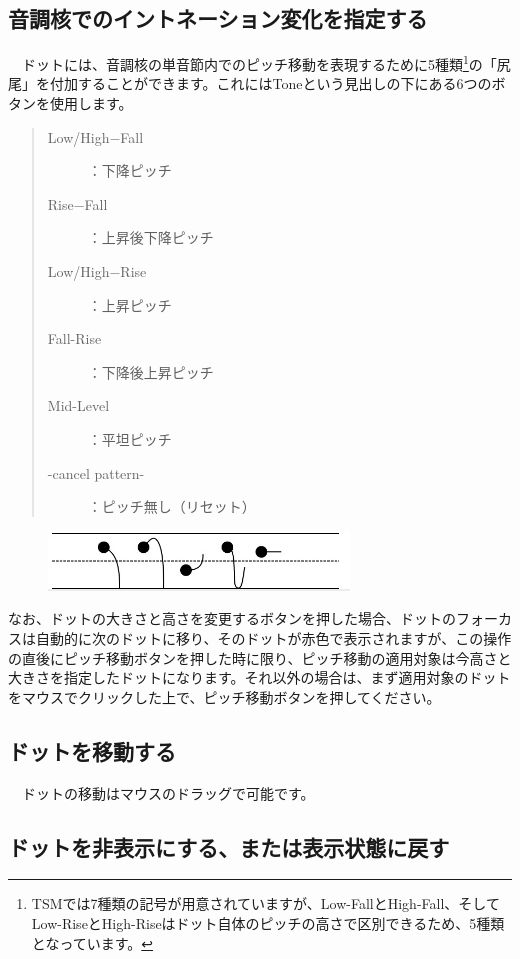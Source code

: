 \subsection{音調核でのイントネーション変化を指定する}

　ドットには、音調核の単音節内でのピッチ移動を表現するために5種類\footnote{TSMでは7種類の記号が用意されていますが、Low-FallとHigh-Fall、そしてLow-RiseとHigh-Riseはドット自体のピッチの高さで区別できるため、5種類となっています。}の「尻尾」を付加することができます。これにはToneという見出しの下にある6つのボタンを使用します。

\begin{quote}
\begin{description}
\item[Low/High−Fall]：下降ピッチ
\item[Rise−Fall]：上昇後下降ピッチ
\item[Low/High−Rise]：上昇ピッチ
\item[Fall-Rise]：下降後上昇ピッチ
\item[Mid-Level]：平坦ピッチ
\item[-cancel pattern-]：ピッチ無し（リセット）
\end{description}
\end{quote}

\begin{figure}[htbp]
\begin{center}
	\includegraphics[width=8cm]{DotsNucleus.png}
 \end{center}
 \label{sampleImage}
\end{figure}


なお、ドットの大きさと高さを変更するボタンを押した場合、ドットのフォーカスは自動的に次のドットに移り、そのドットが赤色で表示されますが、この操作の直後にピッチ移動ボタンを押した時に限り、ピッチ移動の適用対象は今高さと大きさを指定したドットになります。それ以外の場合は、まず適用対象のドットをマウスでクリックした上で、ピッチ移動ボタンを押してください。

\subsection{ドットを移動する}

　ドットの移動はマウスのドラッグで可能です。

\subsection{ドットを非表示にする、または表示状態に戻す}

